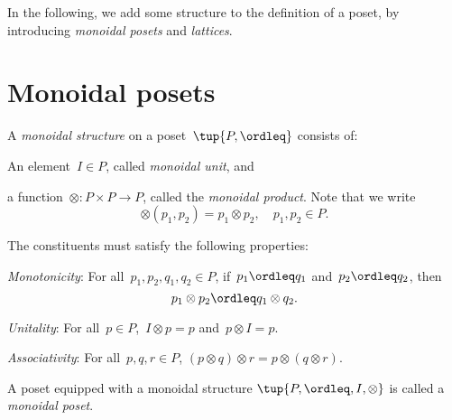 In the following, we add some structure to the definition of a poset, by introducing \emph{monoidal posets} and \emph{lattices}.


\section{Monoidal posets}

\begin{definition}
    \label{def:monoidal_poset}
    A \emph{monoidal structure} on a poset~$\tup{P,\ordleq}$ consists of:
    \begin{compactenum}
        \item An element~$I\in P$, called \emph{monoidal unit}, and
        \item a function~$\otimes\colon P\times P\to P$, called the \emph{monoidal product}. Note that we write
        \begin{equation}
            \otimes(p_1,p_2)=p_1\otimes p_2, \quad p_1,p_2\in P.
        \end{equation}
    \end{compactenum}
    The constituents must satisfy the following properties:
    \begin{compactenum}[(a)]
        \item \emph{Monotonicity}: For all~$p_1,p_2,q_1,q_2\in P$, if~$p_1\ordleq q_1$ and~$p_2\ordleq q_2$, then
        \begin{equation*}
            p_1\otimes p_2\ordleq q_1\otimes q_2.
        \end{equation*}
        \item \emph{Unitality}: For all~$p\in P$,~$I\otimes p=p$ and~$p\otimes I=p$.
        \item \emph{Associativity}: For all~$p,q,r\in P$, $(p\otimes q)\otimes r=p\otimes (q\otimes r)$.
    \end{compactenum}
    A poset equipped with a monoidal structure $\tup{P,\ordleq,I,\otimes}$ is called a \emph{monoidal poset}.
\end{definition}

